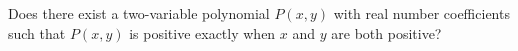 Does there exist a two-variable polynomial $P(x, y)$ with real number coefficients such that $P(x, y)$ is positive exactly when $x$ and $y$ are both positive?